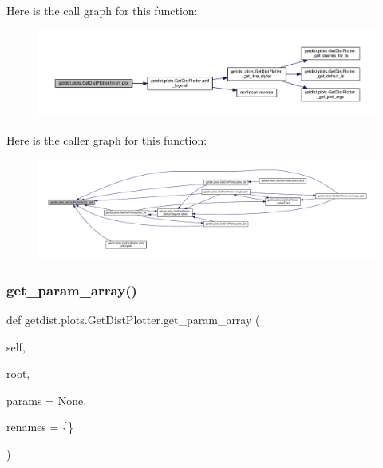 Here is the call graph for this function\+:
\nopagebreak
\begin{figure}[H]
\begin{center}
\leavevmode
\includegraphics[width=350pt]{classgetdist_1_1plots_1_1GetDistPlotter_a2ab4d56845a5abefe27c2d5d62bfb680_cgraph}
\end{center}
\end{figure}
Here is the caller graph for this function\+:
\nopagebreak
\begin{figure}[H]
\begin{center}
\leavevmode
\includegraphics[width=350pt]{classgetdist_1_1plots_1_1GetDistPlotter_a2ab4d56845a5abefe27c2d5d62bfb680_icgraph}
\end{center}
\end{figure}
\mbox{\label{classgetdist_1_1plots_1_1GetDistPlotter_a0b580d3d50c53c534fa8c1a6cefea4d0}} 
\subsubsection{\texorpdfstring{get\+\_\+param\+\_\+array()}{get\_param\_array()}}
{\footnotesize\ttfamily def getdist.\+plots.\+Get\+Dist\+Plotter.\+get\+\_\+param\+\_\+array (\begin{DoxyParamCaption}\item[{}]{self,  }\item[{}]{root,  }\item[{}]{params = {\ttfamily None},  }\item[{}]{renames = {\ttfamily \{\}} }\end{DoxyParamCaption})}

